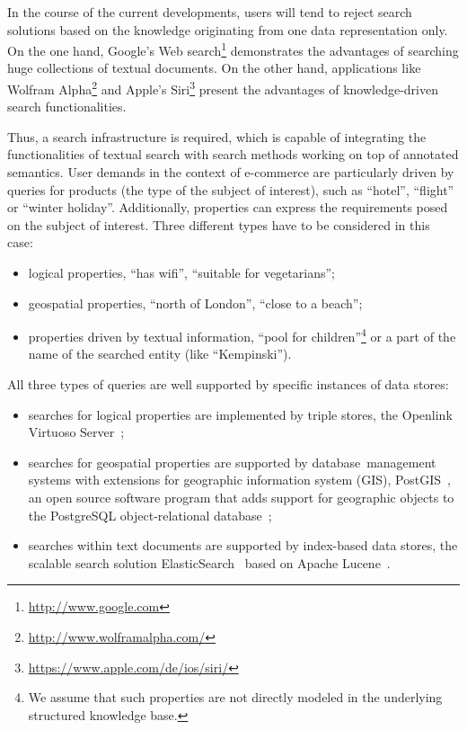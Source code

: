 In the course of the current developments, users will tend to reject search solutions based on the knowledge originating from one data representation only. 
On the one hand, Google's Web search\footnote{\url{http://www.google.com}} demonstrates the advantages of searching huge collections of textual documents. 
On the other hand, applications like Wolfram Alpha\footnote{\url{http://www.wolframalpha.com/}} and Apple's Siri\footnote{\url{https://www.apple.com/de/ios/siri/}} present the advantages of knowledge-driven search functionalities.

Thus, a search infrastructure is required, which is capable of integrating the functionalities of textual search with search methods working on top of annotated semantics. 
User demands in the context of e-commerce are particularly driven by queries for products (\ie the type of the subject of interest), such as ``hotel'', ``flight'' or ``winter holiday''.
Additionally, properties can express the requirements posed on the subject of interest. 
Three different types have to be considered in this case:
\begin{itemize}
\item logical properties, \eg ``has wifi'', ``suitable for vegetarians'';
\item geospatial properties, \eg ``north of London'', ``close to a beach'';
\item properties driven by textual information, \eg ``pool for children''\footnote{We assume that such properties are not directly modeled in the underlying structured knowledge base.} or a part of the name of the searched entity (like ``Kempinski'').
\end{itemize}

All three types of queries are well supported by specific instances of data stores:

\begin{itemize}
\item searches for logical properties are implemented by triple stores, \eg the Openlink Virtuoso Server~\cite{erling2009rdf};
\item searches for geospatial properties are supported by data\-base\ management systems with extensions for geo\-gra\-phic information system (GIS), \eg PostGIS~\cite{obe2011postgis}, an open source software program that adds support for geographic objects to the PostgreSQL object-relational database~\cite{momjian2001postgresql};
\item searches within text documents are supported by index-based data stores, \eg the scalable search solution ElasticSearch~\cite{kuc2013elasticsearch} based on Apache Lucene~\cite{hatcher2004lucene}.
\end{itemize}

